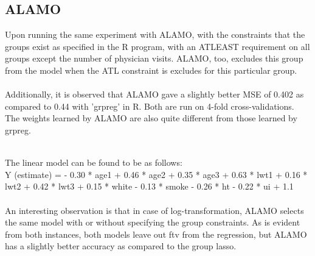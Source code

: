 \documentclass[a4paper,12pt]{article}
\begin{document}
\subsection{ALAMO}
Upon running the same experiment with ALAMO, with the constraints that the groups exist as specified in the R program, with an ATLEAST requirement on all groups except the {number of physician visits}. ALAMO, too, excludes this group from the model when the ATL constraint is excludes for this particular group. \\ \\
Additionally, it is observed that ALAMO gave a slightly better MSE of 0.402 as compared to 0.44 with 'grpreg' in R. Both are run on 4-fold cross-validations. The weights learned by ALAMO are also quite different from those learned by grpreg. \\
\begin{table}[H]
\centering
{}
\caption{Solution paths of ALAMO}

\end{table}
\\
The linear model can be found to be as follows:\\
Y (estimate) = - 0.30 * age1 + 0.46 * age2 + 0.35 * age3 + 0.63 * lwt1 + 0.16 * lwt2 + 0.42 * lwt3 + 0.15 * white - 0.13 * smoke - 0.26 * ht - 0.22 * ui + 1.1
\\
\\
An interesting observation is that in case of log-transformation, ALAMO selects the same model with or without specifying the group constraints.
As is evident from both instances, both models leave out ftv from the regression, but ALAMO has a slightly better accuracy as compared to the group lasso.
\end{document}
